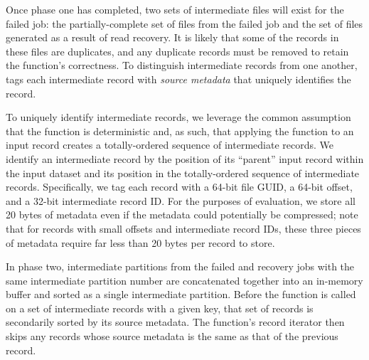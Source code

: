 Once phase one has completed, two sets of intermediate files will exist for the
failed job: the partially-complete set of files from the failed job and the set
of files generated as a result of read recovery. It is likely that some of the
records in these files are duplicates, and any duplicate records must be
removed to retain the \reduce function's correctness. To distinguish
intermediate records from one another, \themis tags each intermediate record
with \emph{source metadata} that uniquely identifies the record.

To uniquely identify intermediate records, we leverage the common assumption
that the \map function is deterministic and, as such, that applying the \map
function to an input record creates a totally-ordered sequence of intermediate
records. We identify an intermediate record by the position of its ``parent''
input record within the input dataset and its position in the totally-ordered
sequence of intermediate records. Specifically, we tag each record with a
64-bit file GUID, a 64-bit offset, and a 32-bit intermediate record ID. For the
purposes of evaluation, we store all 20 bytes of metadata even if the metadata
could potentially be compressed; note that for records with small offsets and
intermediate record IDs, these three pieces of metadata require far less than
20 bytes per record to store.

In phase two, intermediate partitions from the failed and recovery jobs with
the same intermediate partition number are concatenated together into an
in-memory buffer and sorted as a single intermediate partition. Before the
\reduce function is called on a set of intermediate records with a given key,
that set of records is secondarily sorted by its source metadata. The \reduce
function's record iterator then skips any records whose source metadata is the
same as that of the previous record.
